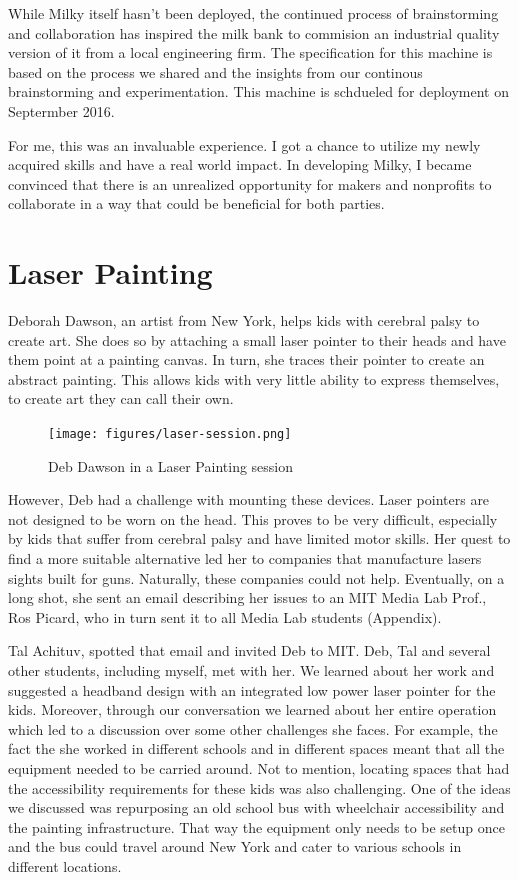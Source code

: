 While Milky itself hasn't been deployed, the continued process of brainstorming and collaboration has inspired the milk bank to commision an industrial quality version of it from a local engineering firm. The specification for this machine is based on the process we shared and the insights from our continous brainstorming and experimentation. This machine is schdueled for deployment on Septermber 2016.

For me, this was an invaluable experience. I got a chance to utilize my newly acquired skills and have a real world impact.  In developing Milky, I became convinced that there is an unrealized opportunity for makers and nonprofits to collaborate in a way that could be beneficial for both parties.

\section{Laser Painting}

Deborah Dawson, an artist from New York, helps kids with cerebral palsy to create art. She does so by attaching a small laser pointer to their heads and have them point at a painting canvas. In turn, she traces their pointer to create an abstract painting. This allows kids with very little ability to express themselves, to create art they can call their own.

   \begin{figure}[thpb]
      \centering
      \texttt{[image: figures/laser-session.png]}
      \caption{Deb Dawson in a Laser Painting session}
      \label{laser-session}
   \end{figure}

However, Deb had a challenge with mounting these devices. Laser pointers are not designed to be worn on the head. This proves to be very difficult, especially by kids that suffer from cerebral palsy and have limited motor skills. Her quest to find a more suitable alternative led her to companies that manufacture lasers sights built for guns. Naturally, these companies could not help. Eventually, on a long shot, she sent an email describing her issues to an MIT Media Lab Prof., Ros Picard, who in turn sent it to all Media Lab students (Appendix). 


Tal Achituv, spotted that email and invited Deb to MIT. Deb, Tal and several other students, including myself, met with her. We learned about her work and suggested a headband design with an integrated low power laser pointer for the kids. Moreover, through our conversation we learned about her entire operation which led to a discussion over some other challenges she faces. For example, the fact the she worked in different schools and in different spaces meant that all the equipment needed to be carried around. Not to mention, locating spaces that had the accessibility requirements for these kids was also challenging. One of the ideas we discussed was repurposing an old school bus with wheelchair accessibility and the painting infrastructure. That way the equipment only needs to be setup once and the bus could travel around New York and cater to various schools in different locations. 

